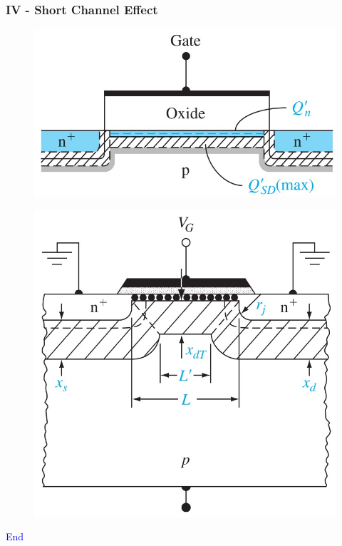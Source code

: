 \documentclass{beamer}
\begin{document}
    \begin{frame} \frametitle{IV - Short Channel Effect}
        \begin{figure}[H]
            \centering
            \includegraphics[width=0.4\linewidth]{Short-channel-effects-long-channel.jpg}
            \label{fig:Short-channel-effects-long-channel.jpg}
        \end{figure}
        \begin{figure}[H]
            \centering
            \includegraphics[width=0.5\linewidth]{Short-channel-effects.jpg}
            \label{fig:Short-channel-effects.jpg}
        \end{figure}
    \end{frame}


    \begin{frame} 
        \begin{center}
            \Large\textcolor{blue}{End}
        \end{center}
    \end{frame}
\end{document}
